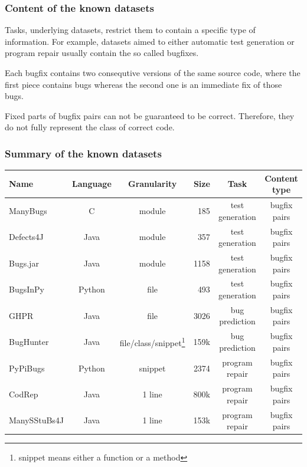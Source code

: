 \documentclass{beamer}
\begin{document}
\begin{frame}
\frametitle{Content of the known datasets}

Tasks, underlying datasets, restrict them to contain a specific type of information.
For example, datasets aimed to either automatic test generation or program repair usually contain the so called bugfixes. 
\newline

Each bugfix contains two consequtive versions of the same source code,
where the first piece contains bugs whereas the second one is an immediate fix of those bugs.
\newline

Fixed parts of bugfix pairs can not be guaranteed to be correct. Therefore,
they do not fully represent the class of correct code.

\end{frame}


\begin{frame}
\frametitle{Summary of the known datasets}

{\tiny
\begin{table}
\begin{tabular}{|l|c|c|r|c|c|}
\hline
    Name & Language & Granularity & Size & Task & Content type \\
\hline
    ManyBugs & C & module & 185 & test generation & bugfix pairs\\
    Defects4J & Java & module & 357 & test generation & bugfix pairs\\
    Bugs.jar & Java & module & 1158 & test generation & bugfix pairs\\
    BugsInPy & Python & file & 493 & test generation & bugfix pairs\\
    GHPR & Java & file & 3026 & bug prediction & bugfix pairs\\
	BugHunter & Java & file/class/snippet\footnote{snippet means either a function or a method} & 159k & bug prediction & bugfix pairs \\
	PyPiBugs & Python & snippet & 2374 & program repair & bugfix pairs \\
    CodRep & Java & 1 line & 800k & program repair & bugfix pairs \\
    ManySStuBs4J & Java & 1 line & 153k & program repair & bugfix pairs \\
\hline
\end{tabular}
\end{table}}


\end{frame}
\end{document}
